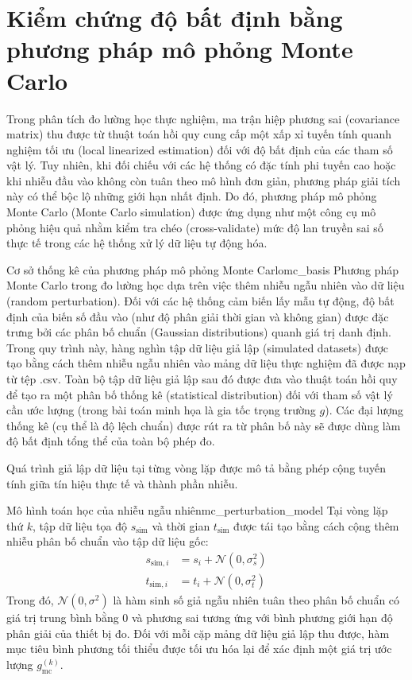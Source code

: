 \section{Kiểm chứng độ bất định bằng phương pháp mô phỏng Monte Carlo}
\label{sec:4_3_monte_carlo}

Trong phân tích đo lường học thực nghiệm, ma trận hiệp phương sai (covariance matrix) thu được từ thuật toán hồi quy cung cấp một xấp xỉ tuyến tính quanh nghiệm tối ưu (local linearized estimation) đối với độ bất định của các tham số vật lý. Tuy nhiên, khi đối chiếu với các hệ thống có đặc tính phi tuyến cao hoặc khi nhiễu đầu vào không còn tuân theo mô hình đơn giản, phương pháp giải tích này có thể bộc lộ những giới hạn nhất định. Do đó, phương pháp mô phỏng Monte Carlo (Monte Carlo simulation) được ứng dụng như một công cụ mô phỏng hiệu quả nhằm kiểm tra chéo (cross-validate) mức độ lan truyền sai số thực tế trong các hệ thống xử lý dữ liệu tự động hóa.

\begin{physcore}{Cơ sở thống kê của phương pháp mô phỏng Monte Carlo}{mc_basis}
Phương pháp Monte Carlo trong đo lường học dựa trên việc thêm nhiễu ngẫu nhiên vào dữ liệu (random perturbation). Đối với các hệ thống cảm biến lấy mẫu tự động, độ bất định của biến số đầu vào (như độ phân giải thời gian và không gian) được đặc trưng bởi các phân bố chuẩn (Gaussian distributions) quanh giá trị danh định. Trong quy trình này, hàng nghìn tập dữ liệu giả lập (simulated datasets) được tạo bằng cách thêm nhiễu ngẫu nhiên vào mảng dữ liệu thực nghiệm đã được nạp từ tệp .csv. Toàn bộ tập dữ liệu giả lập sau đó được đưa vào thuật toán hồi quy để tạo ra một phân bố thống kê (statistical distribution) đối với tham số vật lý cần ước lượng (trong bài toán minh họa là gia tốc trọng trường $g$). Các đại lượng thống kê (cụ thể là độ lệch chuẩn) được rút ra từ phân bố này sẽ được dùng làm độ bất định tổng thể của toàn bộ phép đo.
\end{physcore}

Quá trình giả lập dữ liệu tại từng vòng lặp được mô tả bằng phép cộng tuyến tính giữa tín hiệu thực tế và thành phần nhiễu.

\begin{derivation}{Mô hình toán học của nhiễu ngẫu nhiên}{mc_perturbation_model}
Tại vòng lặp thứ $k$, tập dữ liệu tọa độ $s_{\text{sim}}$ và thời gian $t_{\text{sim}}$ được tái tạo bằng cách cộng thêm nhiễu phân bố chuẩn vào tập dữ liệu gốc:
\begin{align}
    s_{\text{sim}, i} &= s_i + \mathcal{N}(0, \sigma_s^2) \\
    t_{\text{sim}, i} &= t_i + \mathcal{N}(0, \sigma_t^2)
\end{align}
Trong đó, $\mathcal{N}(0, \sigma^2)$ là hàm sinh số giả ngẫu nhiên tuân theo phân bố chuẩn có giá trị trung bình bằng $0$ và phương sai tương ứng với bình phương giới hạn độ phân giải của thiết bị đo. Đối với mỗi cặp mảng dữ liệu giả lập thu được, hàm mục tiêu bình phương tối thiểu được tối ưu hóa lại để xác định một giá trị ước lượng $g_{\text{mc}}^{(k)}$.
\end{derivation}

